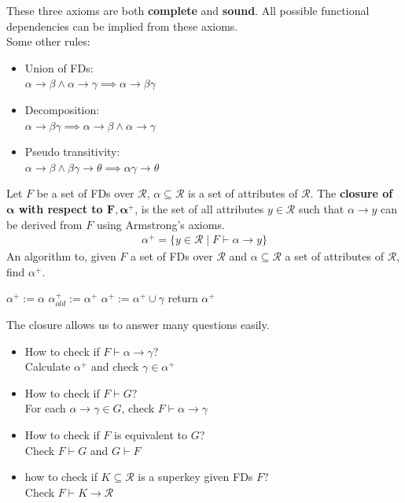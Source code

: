 These three axioms are both \textbf{complete} and \textbf{sound}. All possible functional dependencies can be implied from these axioms.\\
Some other rules:
\begin{itemize}
\item Union of FDs:\\
$\alpha \to \beta \land \alpha \to \gamma \implies \alpha \to \beta\gamma$
\item Decomposition:\\
$\alpha \to \beta\gamma \implies \alpha \to \beta \land \alpha \to \gamma$
\item Pseudo transitivity:\\
$\alpha \to \beta \land \beta\gamma \to \theta \implies \alpha\gamma \to \theta$
\end{itemize} 
Let $F$ be a set of FDs over $\mathcal{R}$, $\alpha \subseteq \mathcal{R}$ is a set of attributes of $\mathcal{R}$. The \textbf{closure of $\boldsymbol{\alpha}$ with respect to $\boldsymbol{F, \alpha^+}$}, is the set of all attributes $y \in \mathcal{R}$ such that $\alpha \to y$ can be derived from $F$ using Armstrong's axioms.
\begin{align*}
\alpha^+ = \{y \in \mathcal{R} \mid F \vdash \alpha \to y\}
\end{align*}
An algorithm to, given $F$ a set of FDs over $\mathcal{R}$ and $\alpha \subseteq \mathcal{R}$ a set of attributes of $\mathcal{R}$, find $\alpha^+$.
\begin{algorithm}
\caption{$Closure(F, \alpha)$}
\begin{algorithmic}
\State $\alpha^+ := \alpha$
\Repeat
	\State $\alpha_{old}^+ := \alpha^+$
		\If{$\beta \subseteq \alpha^+$}
			\State $\alpha^+ := \alpha^+ \cup \gamma$
		\EndIf
	\EndFor
{}
\State return $\alpha^+$
\end{algorithmic}
\end{algorithm}
The closure allows us to answer many questions easily.
\begin{itemize}
\item How to check if $F \vdash \alpha \to \gamma$?\\
Calculate $\alpha^+$ and check $\gamma \in \alpha^+$
\item How to check if $F \vdash G$?\\
For each $\alpha \to \gamma \in G$, check $F \vdash \alpha \to \gamma$
\item How to check if $F$ is equivalent to $G$?\\
Check $F \vdash G$ and $G \vdash F$
\item how to check if $K \subseteq \mathcal{R}$ is a superkey given FDs $F$?\\
Check $F \vdash K \to \mathcal{R}$
\end{itemize}

